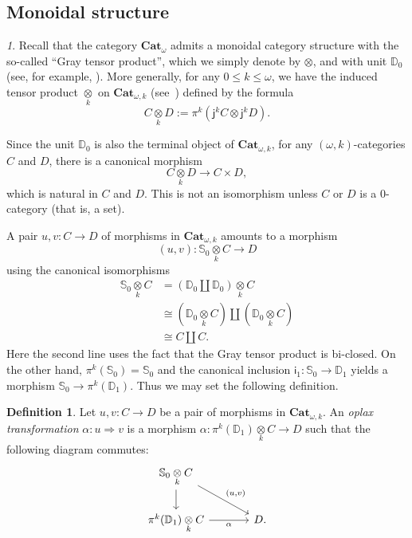 \documentclass[reqno]{amsart}
\theoremstyle{plain}
\theoremstyle{definition}
\newtheorem{definition}[subsubsection]{Definition}
\theoremstyle{remark}
\newtheorem{paragr}[subsubsection]{} %
\newcommand{\pair}[2]{(#1,#2)}       %
\newcommand{\ctg}[1]{\mathbf{#1}}  %
\newcommand{\Cat}{\ctg{Cat}}   %
\newcommand{\nCat}[1]{\Cat_{#1}}  %
\newcommand{\opCat}[1]{\Cat_{\omega,#1}} %
\newcommand{\oCat}{\nCat{\omega}} %
\newcommand{\functor}[1]{\mathsf{#1}} %
\newcommand{\emb}[2]{\functor{j}_{#2}^{#1}}%
\newcommand{\pifun}[2]{\functor{\pi}_{#2}^{#1}}%
\newcommand{\oemb}[1]{\emb{#1}{}}%
\newcommand{\opifun}[1]{\pifun{#1}{}}%
\newcommand{\oo}{\ensuremath{\omega}}
\newcommand{\ook}[1]{\ensuremath{\pair{\omega}{#1}}}
\newcommand{\Sph}[1]{\mathbb{S}_{#1}} %
\newcommand{\Dsk}[1]{\mathbb{D}_{#1}} %
\newcommand{\gcof}[1]{\functor{i}_{#1}} %
\newcommand{\gray}{\otimes}
\newcommand{\grayk}[1]{\underset{#1}{\gray}} %
\newcommand{\nbd}{\nobreakdash} %
\begin{document}
\subsection{Monoidal structure}\label{subsec:monoidal}


\begin{paragr}\label{paragr:gray}
  Recall that the category $\oCat$ admits a monoidal category
  structure with the so-called ``Gray tensor product'',
  which we simply denote by $\gray$, and with unit $\Dsk{0}$ (see, for example,
  \cite[Appendice A]{ara_maltsiniotis:joint}). More generally, for any $0 \leq k \leq \oo$, we have
  the induced tensor product $\grayk{k}$ on $\opCat{k}$
  (see~\cite[Section 6]{ara_lucas:folmon}) defined by the
  formula
  \[
    C \grayk{k} D :=\opifun{k}(\oemb{k}C\gray \oemb{k}D).
  \]
  
  Since the unit $\Dsk{0}$ is also the terminal object of $\opCat{k}$,
  for any \ook k\nbd-categories $C$ and $D$, there is a canonical
  morphism
  \[
    C\grayk{k} D \to C \times D,
  \]
  which is natural in $C$ and $D$. This is not an isomorphism unless
  $C$ or $D$ is a $0$\nbd-category (that is, a set).

  
  A pair $u, v \colon C \to D$ of morphisms in $\opCat{k}$ amounts to
  a morphism
  \[\pair{u}{v}\colon \Sph{0}\grayk{k}C\to D\]
  using the canonical isomorphisms
   \[
    \begin{aligned}
      \Sph{0}\grayk{k}C &=(\Dsk{0}\coprod \Dsk{0})\grayk{k}C \\
      &\cong \left(\Dsk{0}\grayk{k}C\right)\coprod
        \left(\Dsk{0}\grayk{k}C\right) \\
      &\cong C \coprod C.
    \end{aligned}
  \]
  Here the second line uses the fact that the Gray tensor product is
  bi-closed. On the other hand, $\opifun{k}(\Sph 0)=\Sph 0$ and the
  canonical inclusion $\gcof 1\colon\Sph 0\to \Dsk 1$ yields  a
  morphism $\Sph 0\to \opifun{k}(\Dsk 1)$. Thus we may set the
  following definition.
\end{paragr}
\begin{definition}\label{def:oplax}
  Let $u,v\colon C\to D$ be a pair of morphisms in $\opCat k$. An {\em
    oplax transformation} $\alpha\colon u \Rightarrow v$ is a morphism
$ \alpha \colon \opifun{k}(\Dsk{1})\grayk{k}C \to D$
  such that the following diagram commutes:
  \[
    \begin{tikzcd}[column sep=large]
      \Sph{0}\grayk{k} C \ar[d] \ar[dr,"{\left(u,v\right)}"] & \\
      \opifun{k}(\Dsk{1})\grayk{k}C \ar[r,"\alpha"'] & D. 
    \end{tikzcd}
  \]
\end{definition}
  
\end{document}
